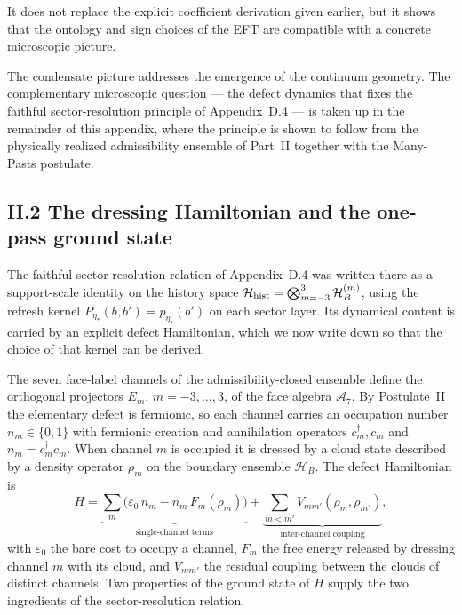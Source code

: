 \documentclass[11pt]{article}
\begin{document}
It does not replace the explicit coefficient derivation given earlier, but it shows that the ontology and sign choices of the EFT are compatible with a concrete microscopic picture.

The condensate picture addresses the emergence of the continuum geometry. The complementary microscopic question --- the defect dynamics that fixes the faithful sector-resolution principle of Appendix~D.4 --- is taken up in the remainder of this appendix, where the principle is shown to follow from the physically realized admissibility ensemble of Part~II together with the Many-Pasts postulate.

\subsection*{H.2 The dressing Hamiltonian and the one-pass ground state}

The faithful sector-resolution relation of Appendix~D.4 was written there as a support-scale identity on the history space $\mathcal H_{\rm hist}=\bigotimes_{m=-3}^{3}\mathcal H_B^{(m)}$, using the refresh kernel $P_{\eta_*}(b,b')=p_{\eta_*}(b')$ on each sector layer. Its dynamical content is carried by an explicit defect Hamiltonian, which we now write down so that the choice of that kernel can be derived.

The seven face-label channels of the admissibility-closed ensemble define the orthogonal projectors $E_m$, $m=-3,\ldots,3$, of the face algebra $\mathcal A_7$. By Postulate~II the elementary defect is fermionic, so each channel carries an occupation number $n_m\in\{0,1\}$ with fermionic creation and annihilation operators $c_m^\dagger,c_m$ and $n_m=c_m^\dagger c_m$. When channel $m$ is occupied it is dressed by a cloud state described by a density operator $\rho_m$ on the boundary ensemble $\mathcal H_B$. The defect Hamiltonian is
\[
H
=
\underbrace{\sum_{m}\bigl(\varepsilon_0\,n_m-n_m\,F_m(\rho_m)\bigr)}_{\text{single-channel terms}}
+
\underbrace{\sum_{m<m'}V_{mm'}(\rho_m,\rho_{m'})}_{\text{inter-channel coupling}},
\]
with $\varepsilon_0$ the bare cost to occupy a channel, $F_m$ the free energy released by dressing channel $m$ with its cloud, and $V_{mm'}$ the residual coupling between the clouds of distinct channels. Two properties of the ground state of $H$ supply the two ingredients of the sector-resolution relation.
\end{document}
